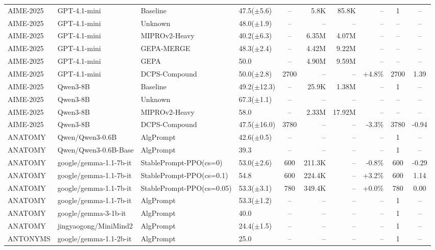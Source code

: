 {\begin{longtable}{@{}p{5.5cm}p{4.5cm}p{2.5cm}lcrrrcc@{}}
\midrule
AIME-2025 & GPT-4.1-mini & Baseline & 47.5($\pm$5.6) & -- & 5.8K & 85.8K & -- & 1 & -- \\
AIME-2025 & GPT-4.1-mini & Unknown & 48.0($\pm$1.9) & -- & -- & -- & -- & -- & -- \\
AIME-2025 & GPT-4.1-mini & MIPROv2-Heavy & 40.2($\pm$6.3) & -- & 6.35M & 4.07M & -- & -- & -- \\
AIME-2025 & GPT-4.1-mini & GEPA-MERGE & 48.3($\pm$2.4) & -- & 4.42M & 9.22M & -- & -- & -- \\
AIME-2025 & GPT-4.1-mini & GEPA & 50.0 & -- & 4.90M & 9.59M & -- & -- & -- \\
AIME-2025 & GPT-4.1-mini & DCPS-Compound & 50.0($\pm$2.8) & 2700 & -- & -- & +4.8\% & 2700 & 1.39 \\
\midrule
AIME-2025 & Qwen3-8B & Baseline & 49.2($\pm$12.3) & -- & 25.9K & 1.38M & -- & 1 & -- \\
AIME-2025 & Qwen3-8B & Unknown & 67.3($\pm$1.1) & -- & -- & -- & -- & -- & -- \\
AIME-2025 & Qwen3-8B & MIPROv2-Heavy & 58.0 & -- & 2.33M & 17.92M & -- & -- & -- \\
AIME-2025 & Qwen3-8B & DCPS-Compound & 47.5($\pm$16.0) & 3780 & -- & -- & -3.3\% & 3780 & -0.94 \\
\midrule
ANATOMY & Qwen/Qwen3-0.6B & AlgPrompt & 42.6($\pm$0.5) & -- & -- & -- & -- & 1 & -- \\
\midrule
ANATOMY & Qwen/Qwen3-0.6B-Base & AlgPrompt & 39.3 & -- & -- & -- & -- & 1 & -- \\
\midrule
ANATOMY & google/gemma-1.1-7b-it & StablePrompt-PPO(cs=0) & 53.0($\pm$2.6) & 600 & 211.3K & -- & -0.8\% & 600 & -0.29 \\
ANATOMY & google/gemma-1.1-7b-it & StablePrompt-PPO(cs=0.1) & 54.8 & 600 & 224.4K & -- & +3.2\% & 600 & 1.14 \\
ANATOMY & google/gemma-1.1-7b-it & StablePrompt-PPO(cs=0.05) & 53.3($\pm$3.1) & 780 & 349.4K & -- & +0.0\% & 780 & 0.00 \\
ANATOMY & google/gemma-1.1-7b-it & AlgPrompt & 53.3($\pm$1.2) & -- & -- & -- & -- & 1 & -- \\
\midrule
ANATOMY & google/gemma-3-1b-it & AlgPrompt & 40.0 & -- & -- & -- & -- & 1 & -- \\
\midrule
ANATOMY & jingyaogong/MiniMind2 & AlgPrompt & 24.4($\pm$1.5) & -- & -- & -- & -- & 1 & -- \\
\midrule
ANTONYMS & google/gemma-1.1-2b-it & AlgPrompt & 25.0 & -- & -- & -- & -- & 1 & -- \\

\end{longtable}}
